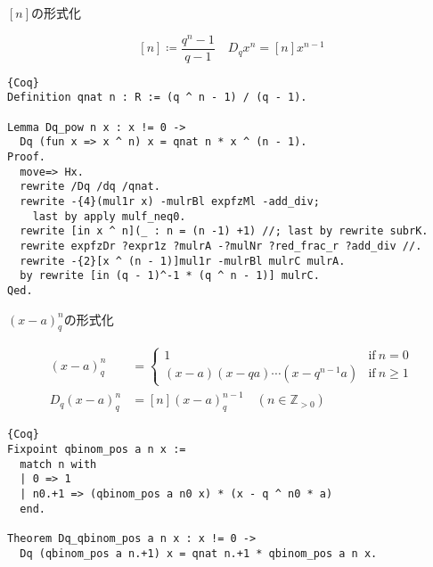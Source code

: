 \documentclass[dvipdfmx,cjk]{beamer}
\theoremstyle{mystyle}
\newcommand{\Z}{\mathbb{Z}}
\newcommand{\0}{\textbf{0}}
\begin{document}
\begin{frame}[fragile]{$[n]$の形式化}
	\begin{screen}
		\[
			[n] \coloneqq \frac{q^n - 1}{q - 1} \quad D_q x^n = [n] x^{n - 1}
		\]
	\end{screen} \pause
	\begin{lstlisting}{Coq}
Definition qnat n : R := (q ^ n - 1) / (q - 1).

Lemma Dq_pow n x : x != 0 ->
  Dq (fun x => x ^ n) x = qnat n * x ^ (n - 1).
Proof.
  move=> Hx.
  rewrite /Dq /dq /qnat.
  rewrite -{4}(mul1r x) -mulrBl expfzMl -add_div;
    last by apply mulf_neq0.
  rewrite [in x ^ n](_ : n = (n -1) +1) //; last by rewrite subrK.
  rewrite expfzDr ?expr1z ?mulrA -?mulNr ?red_frac_r ?add_div //.
  rewrite -{2}[x ^ (n - 1)]mul1r -mulrBl mulrC mulrA.
  by rewrite [in (q - 1)^-1 * (q ^ n - 1)] mulrC.
Qed. \end{lstlisting}
\end{frame}

\begin{frame}[fragile]{$(x - a)^n_q$の形式化}
	\begin{screen}
		\begin{align*}
			(x - a)^n_q &= \begin{cases}
	                      1 & \text{if}\ n = 0 \\
	                      (x - a) (x - qa) \cdots (x - q^{n - 1} a) & \text{if}\ n \ge 1
	                    \end{cases} \\
			D_q (x - a)^n_q &= [n](x - a)^{n - 1}_q \quad (n \in \Z_{>0})
		\end{align*}
	\end{screen} \pause
	\begin{lstlisting}{Coq}
Fixpoint qbinom_pos a n x :=
  match n with
  | 0 => 1
  | n0.+1 => (qbinom_pos a n0 x) * (x - q ^ n0 * a)
  end. 
  
Theorem Dq_qbinom_pos a n x : x != 0 ->
  Dq (qbinom_pos a n.+1) x = qnat n.+1 * qbinom_pos a n x. \end{lstlisting}
\end{frame}

%
\end{document}
